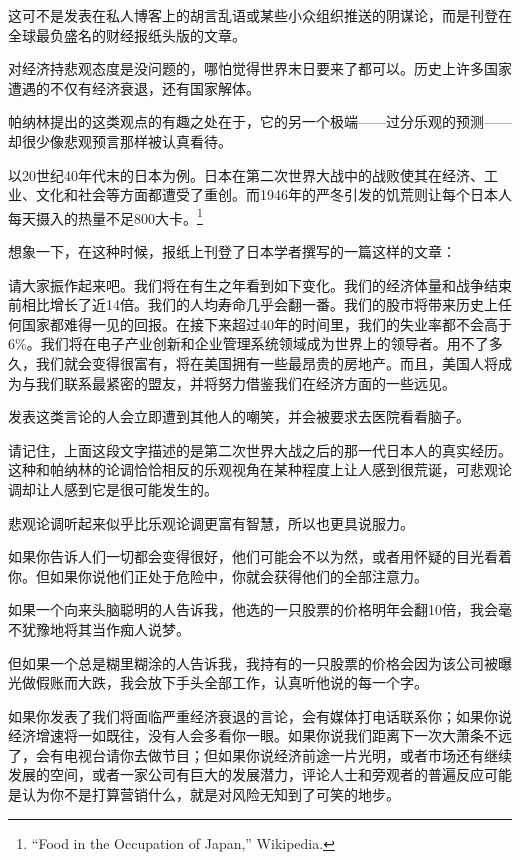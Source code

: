 这可不是发表在私人博客上的胡言乱语或某些小众组织推送的阴谋论，而是刊登在全球最负盛名的财经报纸头版的文章。

对经济持悲观态度是没问题的，哪怕觉得世界末日要来了都可以。历史上许多国家遭遇的不仅有经济衰退，还有国家解体。

帕纳林提出的这类观点的有趣之处在于，它的另一个极端——过分乐观的预测——却很少像悲观预言那样被认真看待。

以20世纪40年代末的日本为例。日本在第二次世界大战中的战败使其在经济、工业、文化和社会等方面都遭受了重创。而1946年的严冬引发的饥荒则让每个日本人每天摄入的热量不足800大卡。\footnote{“Food in the Occupation of Japan,” Wikipedia.}

想象一下，在这种时候，报纸上刊登了日本学者撰写的一篇这样的文章：

{\kaishu

请大家振作起来吧。我们将在有生之年看到如下变化。我们的经济体量和战争结束前相比增长了近14倍。我们的人均寿命几乎会翻一番。我们的股市将带来历史上任何国家都难得一见的回报。在接下来超过40年的时间里，我们的失业率都不会高于6\%。我们将在电子产业创新和企业管理系统领域成为世界上的领导者。用不了多久，我们就会变得很富有，将在美国拥有一些最昂贵的房地产。而且，美国人将成为与我们联系最紧密的盟友，并将努力借鉴我们在经济方面的一些远见。

}

发表这类言论的人会立即遭到其他人的嘲笑，并会被要求去医院看看脑子。

请记住，上面这段文字描述的是第二次世界大战之后的那一代日本人的真实经历。这种和帕纳林的论调恰恰相反的乐观视角在某种程度上让人感到很荒诞，可悲观论调却让人感到它是很可能发生的。

悲观论调听起来似乎比乐观论调更富有智慧，所以也更具说服力。

如果你告诉人们一切都会变得很好，他们可能会不以为然，或者用怀疑的目光看着你。但如果你说他们正处于危险中，你就会获得他们的全部注意力。

如果一个向来头脑聪明的人告诉我，他选的一只股票的价格明年会翻10倍，我会毫不犹豫地将其当作痴人说梦。

但如果一个总是糊里糊涂的人告诉我，我持有的一只股票的价格会因为该公司被曝光做假账而大跌，我会放下手头全部工作，认真听他说的每一个字。

如果你发表了我们将面临严重经济衰退的言论，会有媒体打电话联系你；如果你说经济增速将一如既往，没有人会多看你一眼。如果你说我们距离下一次大萧条不远了，会有电视台请你去做节目；但如果你说经济前途一片光明，或者市场还有继续发展的空间，或者一家公司有巨大的发展潜力，评论人士和旁观者的普遍反应可能是认为你不是打算营销什么，就是对风险无知到了可笑的地步。

